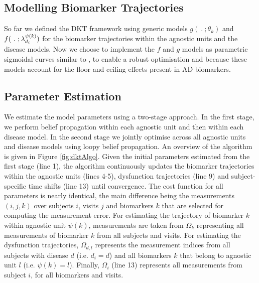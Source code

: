 \documentclass{llncs}
\begin{document}
\subsection{Modelling Biomarker Trajectories}
\label{sec:dktBiomkTraj}

So far we defined the DKT framework using generic models $g(\ .\ ; \theta_k)$ and $f(\ .\ ; \lambda_{d_i}^{\psi(k)})$ for the biomarker trajectories within the agnostic units and the disease models. Now we choose to implement the $f$ and $g$ models as parametric sigmoidal curves similar to \cite{jedynak2012computational}, to enable a robust optimisation and because these models account for the floor and ceiling effects present in AD biomarkers. 

%


\subsection{Parameter Estimation}

\newcommand{\uu}{^{(u)}}
\newcommand{\um}{^{(u-1)}}

We estimate the model parameters using a two-stage approach. In the first stage, we perform belief propagation within each agnostic unit and then within each disease model. In the second stage we jointly optimise across all agnostic units and disease models using loopy belief propagation. An overview of the algorithm is given in Figure \ref{fig:dktAlgo}. Given the initial parameters estimated from the first stage (line 1), the algorithm continuously updates the biomarker trajectories within the agnostic units (lines 4-5), dysfunction trajectories (line 9) and subject-specific time shifts (line 13) until convergence. The cost function for all parameters is nearly identical, the main difference being the measurements $(i,j,k)$ over subjects $i$, visits $j$ and biomarkers $k$ that are selected for computing the measurement error. For estimating the trajectory of biomarker $k$ within agnostic unit $\psi(k)$, measurements are taken from $\Omega_k$ representing all measurements of biomarker $k$ from all subjects and visits. For estimating the dysfunction trajectories, $\Omega_{d,l}$ represents the measurement indices from all subjects with disease $d$ (i.e. $d_i = d$) and all biomarkers $k$ that belong to agnostic unit $l$ (i.e. $\psi(k) = l$). Finally, $\Omega_i$ (line 13) represents all measurements from subject $i$, for all biomarkers and visits. 
\end{document}
